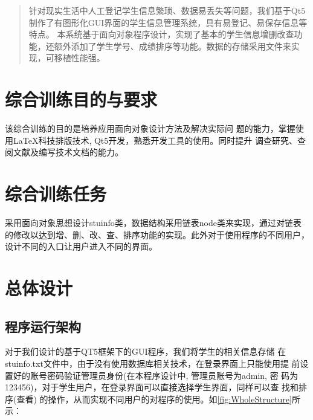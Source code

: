 \documentclass[
  ]{nwafuprojrep}
\begin{document}

\makecover
\tableofcontents
\cleardoublepage
\pagestyle{main}%


\begin{abstract}
  针对现实生活中人工登记学生信息繁琐、数据易丢失等问题，我们基于Qt5制作了有图形化GUI界面的学生信息管理系统，具有易登记、易保存信息等特点。
  本系统基于面向对象程序设计，实现了基本的学生信息增删改查功能，还额外添加了学生学号、成绩排序等功能。数据的存储采用文件来实现，可移植性能强。
\end{abstract}
\makeabstract

\section{综合训练目的与要求}
该综合训练的目的是培养应用面向对象设计方法及解决实际问
题的能力，掌握使用\LaTeX{}科技排版技术, Qt5开发，熟悉开发工具的使用。同时提升
调查研究、查阅文献及编写技术文档的能力。

\section{综合训练任务}
采用面向对象思想设计‌stuinfo类，数据结构采用链表node类来实现，通过对链表的修改以达到增、删、改、查、排序功能的实现。此外对于使用程序的不同用户，设计不同的入口让用户进入不同的界面。

\section{总体设计}
\subsection{程序运行架构}
对于我们设计的基于QT5框架下的GUI程序，我们将学生的相关信息存储
在stuinfo.txt文件中，由于没有使用数据库相关技术，在登录界面上只能使用提
前设置好的账号密码验证管理员身份(在本程序设计中, 管理员账号为admin, 密
码为123456)，对于学生用户，在登录界面可以直接选择学生界面，同样可以查
找和排序(查看) 的操作，从而实现不同用户的对程序的使用。如\autoref{fig:WholeStructure}所示：
\begin{figure}[!htp]
	\begin{floatrow}
	\end{floatrow}
\end{figure}
\end{document}

